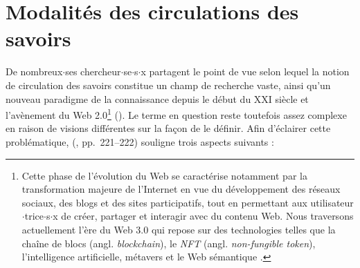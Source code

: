 \label{sota}
\minitoc
\section{Modalités des circulations des savoirs}
De nombreux$\cdot$ses chercheur$\cdot$se$\cdot$s$\cdot$x partagent le point de vue selon lequel la notion de \og{}circulation des savoirs\fg{} constitue un champ de recherche vaste, ainsi qu'un nouveau paradigme de la connaissance depuis le début du XXI\ieme{} siècle et l'avènement du Web 2.0\footnote{Cette phase de l'évolution du Web se caractérise notamment par la transformation majeure de l'Internet en vue du développement des réseaux sociaux, des blogs et des sites participatifs, tout en permettant aux utilisateur$\cdot$trice$\cdot$s$\cdot$x de créer, partager et interagir avec du contenu Web. Nous traversons actuellement l'ère du Web 3.0 qui repose sur des technologies telles que la chaîne de blocs (angl. \textit{blockchain}), le \textit{NFT} (angl. \textit{non-fungible token}), l'intelligence artificielle, métavers et le Web sémantique \citep{varet2023nouvelles}.}  (\citealp{landais2014frederic,quet2014frederic}). Le terme en question reste toutefois assez complexe en raison de visions différentes sur la façon de le définir. Afin d'éclairer cette problématique, \citeauthor{quet2014frederic} (\citeyear{quet2014frederic}, pp.~221--222) souligne trois aspects suivants :
